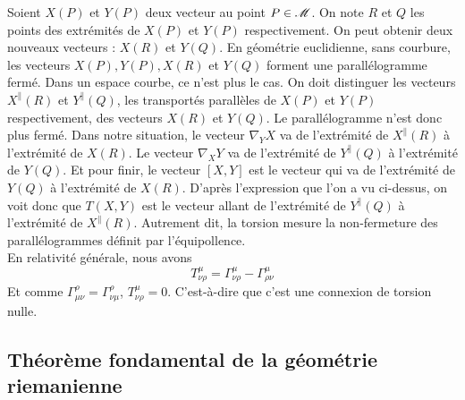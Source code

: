 \documentclass[a4paper,11pt]{report}
\begin{document}
                Soient $X(P)$ et $Y(P)$ deux vecteur au point $P\in \mathscr{M}$. On note $R$ et $Q$ les points des extrémités de $X(P)$ et $Y(P)$ respectivement. On peut obtenir deux nouveaux vecteurs : $X(R)$ et $Y(Q)$. En géométrie euclidienne, sans courbure, les vecteurs $X(P),Y(P),X(R)$ et $Y(Q)$ forment une parallélogramme fermé. Dans un espace courbe, ce n'est plus le cas. On doit distinguer les vecteurs $X^\parallel(R)$ et $Y^\parallel(Q)$, les transportés parallèles de $X(P)$ et $Y(P)$ respectivement, des vecteurs $X(R)$ et $Y(Q)$. Le parallélogramme n'est donc plus fermé. Dans notre situation, le vecteur $\nabla_Y X$ va de l'extrémité de $X^\parallel(R)$ à l'extrémité de $X(R)$. Le vecteur $\nabla_X Y$ va de l'extrémité de $Y^\parallel(Q)$ à l'extrémité de $Y(Q)$. Et pour finir, le vecteur $[X,Y]$ est le vecteur qui va de l'extrémité de $Y(Q)$ à l'extrémité de $X(R)$. D'après l'expression que l'on a vu ci-dessus, on voit donc que $T(X,Y)$ est le vecteur allant de l'extrémité de $Y^\parallel(Q)$ à l'extrémité de $X^\parallel(R)$. Autrement dit, la torsion mesure la non-fermeture des parallélogrammes définit par l'équipollence.\\
                
            
                En relativité générale, nous avons
                \begin{equation}
                    T^\mu_{\nu\rho} = \Gamma^\mu_{\nu\rho} - \Gamma^\mu_{\rho\nu}
                \end{equation}
                Et comme $\Gamma^\rho_{\mu\nu} = \Gamma^\rho_{\nu\mu}$, $T^\mu_{\nu\rho} = 0$. C'est-à-dire que c'est une connexion de torsion nulle.
                
            \subsection{Théorème fondamental de la géométrie riemanienne}
            
\end{document}

